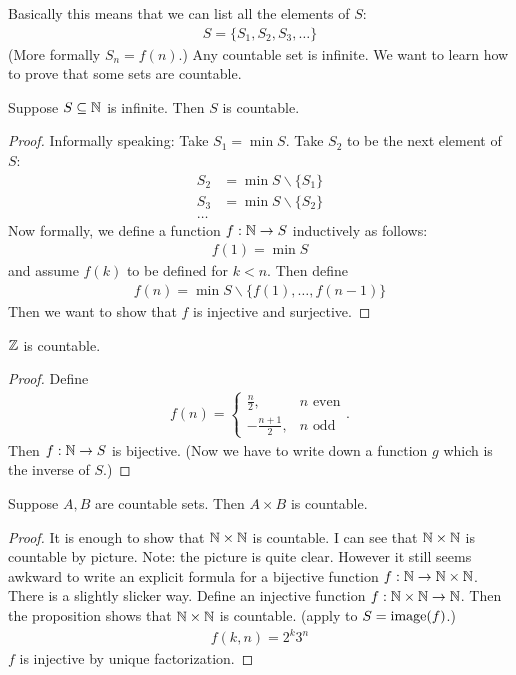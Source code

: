 Basically this means that we can list all the elements of $S$:
\begin{align*}
S = \{ S_1, S_2, S_3, \dots \}
\end{align*}
(More formally $S_n = f(n)$.) Any countable set is infinite.
We want to learn how to prove that some sets are countable.
\begin{pp}
	Suppose $S \subseteq \mathbb N$ is infinite. Then $S$ is countable.
\end{pp}

\begin{proof}
	Informally speaking:
	Take $S_1 = \min S$. Take $S_2$ to be the next element of $S$:
	\begin{align*}
	S_2 & = \min S \backslash \{S_1 \} \\
	S_3 & = \min S \backslash \{S_2 \} \\
	\dots &
	\end{align*}
	Now formally, we define a function $f: \mathbb N \to S$ inductively as follows:
	\begin{align*}
	f(1) = \min S
	\end{align*}
	and assume $f(k)$ to be defined for $k<n$. Then define
	\begin{align*}
	f(n) = \min S \backslash \{ f(1), \dots, f(n-1) \}
	\end{align*}
	Then we want to show that $f$ is injective and surjective.
\end{proof}

\begin{nex}
	\item
	$\mathbb Z$ is countable.
	\begin{proof}
		Define 
		\begin{align*}
		f(n) = \left\{ \begin{array}{rl}
		\frac n 2, &n \text{ even} \\
		-\frac {n+1} 2, & n \text{ odd}
		\end{array} \right. .
		\end{align*}
		Then $f: \mathbb N \to S$ is bijective. (Now we have to write down a function $g$ which is the inverse of $S$.)
	\end{proof}
	\item
	Suppose $A, B$ are countable sets. Then $A \times B$ is countable.
	\begin{proof}
		It is enough to show that $\mathbb N \times \mathbb N$ is countable. I can see that $\mathbb N \times \mathbb N$ is countable by picture.
		Note: the picture is quite clear. However it still seems awkward to write an explicit formula for a bijective function $f: \mathbb N \to \mathbb N \times \mathbb N$. There is a slightly slicker way. Define an injective function $f: \mathbb N \times \mathbb N \to \mathbb N$. Then the proposition shows that $\mathbb N \times \mathbb N$ is countable. (apply to $S = \operatorname{image}(f)$.)
		\begin{align*}
		f(k,n) = 2^k 3^n
		\end{align*}
		$f$ is injective by unique factorization.
	\end{proof}
\end{nex}


